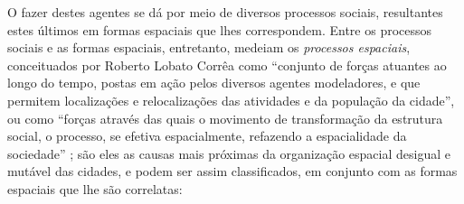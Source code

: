 O fazer destes agentes se dá por meio de diversos processos sociais, resultantes estes últimos em formas espaciais que lhes correspondem. Entre os processos sociais e as formas espaciais, entretanto, medeiam os \textit{processos espaciais}, conceituados por Roberto Lobato Corrêa como ``conjunto de forças atuantes ao longo do tempo, postas em ação pelos diversos agentes modeladores, e que permitem localizações e relocalizações das atividades e da população da cidade'', ou como ``forças através das quais o movimento de transformação da estrutura social, o processo, se efetiva espacialmente, refazendo a espacialidade da sociedade'' \cite[p.~36]{CORREA1985espa}; são eles as causas mais próximas da organização espacial desigual e mutável das cidades, e podem ser assim classificados, em conjunto com as formas espaciais que lhe são correlatas:

